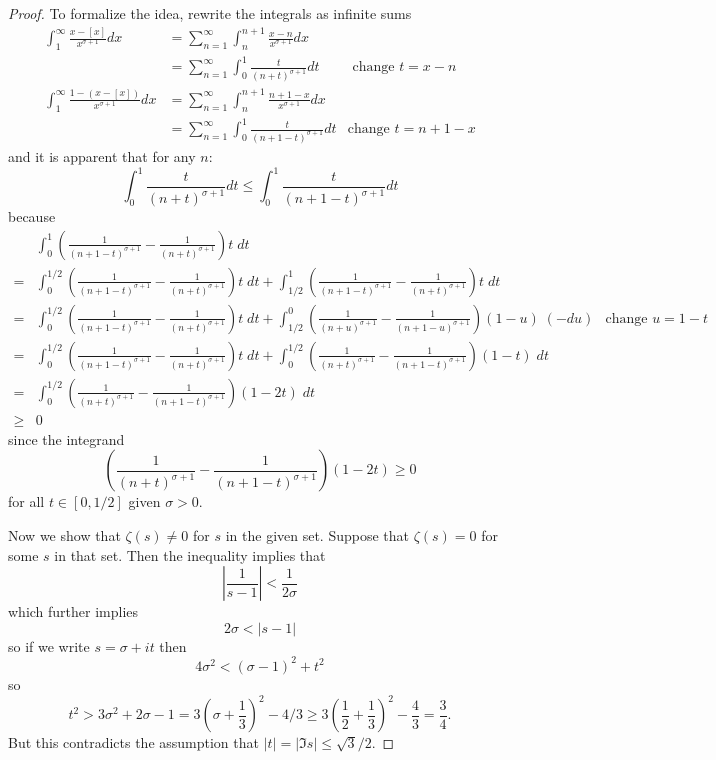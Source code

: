 \documentclass[12pt]{article}
\newcommand{\Abs}[1]{\left| #1 \right|}
\begin{document}
\begin{proof}
To formalize the idea, rewrite the integrals as infinite sums
\begin{align*}
\int_1^\infty \frac{x - [x]}{x^{\sigma + 1}} dx &= \sum_{n=1}^{\infty} \int_n^{n+1} \frac{x - n}{x^{\sigma + 1}} dx\\
&= \sum_{n=1}^{\infty} \int_0^1 \frac{t}{(n + t)^{\sigma + 1}} dt &\text{ change } t = x - n\\
\int_1^\infty \frac{1 - (x - [x])}{x^{\sigma + 1}} dx &= \sum_{n=1}^{\infty} \int_n^{n+1} \frac{n + 1 - x}{x^{\sigma + 1}} dx\\
&= \sum_{n=1}^{\infty} \int_0^1 \frac{t}{(n+1-t)^{\sigma + 1}} dt &\text{change } t = n + 1 - x
\end{align*}
and it is apparent that for any $n$:
$$\int_0^1 \frac{t}{(n + t)^{\sigma + 1}} dt \leq \int_0^1 \frac{t}{(n+1-t)^{\sigma + 1}} dt$$
because
\begin{align*}
&\int_0^1 \left( \frac{1}{(n+1-t)^{\sigma + 1}} - \frac{1}{(n + t)^{\sigma + 1}} \right) t \; dt\\
=& \int_0^{1/2} \left( \frac{1}{(n+1-t)^{\sigma + 1}} - \frac{1}{(n + t)^{\sigma + 1}} \right) t \; dt + \int_{1/2}^1 \left( \frac{1}{(n+1-t)^{\sigma + 1}} - \frac{1}{(n + t)^{\sigma + 1}} \right) t \; dt\\
=& \int_0^{1/2} \left( \frac{1}{(n+1-t)^{\sigma + 1}} - \frac{1}{(n + t)^{\sigma + 1}} \right) t \; dt + \int_{1/2}^0 \left( \frac{1}{(n+u)^{\sigma + 1}} - \frac{1}{(n + 1 - u)^{\sigma + 1}} \right) (1 - u) \; (-du) &\text{change } u = 1 - t\\
=& \int_0^{1/2} \left( \frac{1}{(n+1-t)^{\sigma + 1}} - \frac{1}{(n + t)^{\sigma + 1}} \right) t \; dt + \int_0^{1/2} \left( \frac{1}{(n+t)^{\sigma + 1}} - \frac{1}{(n + 1 - t)^{\sigma + 1}} \right) (1 - t) \; dt\\
=& \int_0^{1/2} \left( \frac{1}{(n+t)^{\sigma + 1}} - \frac{1}{(n + 1 - t)^{\sigma + 1}} \right) (1 - 2 t) \; dt\\
\geq& 0
\end{align*}
since the integrand
$$\left( \frac{1}{(n+t)^{\sigma + 1}} - \frac{1}{(n + 1 - t)^{\sigma + 1}} \right) (1 - 2 t) \geq 0$$
for all $t \in [0, 1/2]$ given $\sigma > 0$.

Now we show that $\zeta(s) \not = 0$ for $s$ in the given set. Suppose that $\zeta(s) = 0$ for some $s$ in that set. Then the inequality implies that
$$\Abs{\frac{1}{s - 1}} < \frac{1}{2\sigma}$$
which further implies
$$2\sigma < |s - 1|$$
so if we write $s = \sigma + i t$ then
$$4\sigma^2 < (\sigma - 1)^2 + t^2$$
so
$$t^2 > 3\sigma^2 + 2\sigma - 1 %
= 3 \left(\sigma + \frac13\right)^2 - 4/3 \geq 3 \left(\frac12 + \frac13\right)^2 - \frac43 = \frac34.$$
But this contradicts the assumption that $|t| = |\Im s| \leq \sqrt 3 / 2$.
\end{proof}

\unless\ifdefined\IsMainDocument
\end{document}
